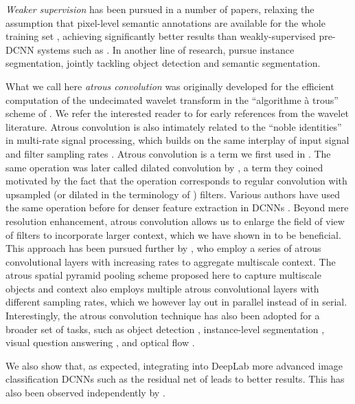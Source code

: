\documentclass[10pt,journal,compsoc]{IEEEtran}
\begin{document}
\emph{Weaker supervision} has been pursued in a number of papers, relaxing
the assumption that pixel-level semantic annotations are available for the whole
training set \cite{pinheiro2014weakly, papandreou2015weakly, pathakICCV15ccnn, hong2015decoupled},
achieving significantly better results than weakly-supervised pre-DCNN systems
such as \cite{vezhnevets2011weakly}. In another line of research,
\cite{hariharan2014simultaneous, liang2015proposal} pursue instance segmentation, jointly tackling  object detection and semantic
segmentation.

What we call here \emph{atrous convolution} was originally developed for the efficient
computation of the undecimated wavelet transform in the ``algorithme \`a trous''
scheme of \cite{holschneider1989real}. We refer the interested reader to
\cite{fowler2005redundant} for early references from the wavelet literature.
Atrous convolution is also intimately related to the ``noble identities'' in
multi-rate signal processing, which builds on the same interplay of input signal
and filter sampling rates \cite{vaidyanathan1990multirate}. Atrous convolution
is a term we first used in \cite{papandreou2014untangling}. The same operation
was later called dilated convolution by \cite{yu2015multi}, a term they coined
motivated by the fact that the operation corresponds to regular convolution
with upsampled (or dilated in the terminology of \cite{holschneider1989real})
filters. Various authors have used the same operation before for denser feature
extraction in DCNNs \cite{giusti2013fast, sermanet2013overfeat, papandreou2014untangling}.
Beyond mere resolution enhancement, atrous convolution allows us to enlarge the
field of view of filters to incorporate larger context, which we have shown in
\cite{chen2014semantic} to be beneficial. This approach has been pursued further
by \cite{yu2015multi}, who employ a series of atrous convolutional layers with
increasing rates to aggregate multiscale context. The atrous spatial pyramid
pooling scheme proposed here to capture multiscale objects and context also
employs multiple atrous convolutional layers with different sampling rates,
which we however lay out in parallel instead of in serial.
Interestingly, the atrous convolution technique has also been adopted for a broader set of  tasks, such as object detection
 \cite{liu2015ssd,dai2016rfcn}, instance-level segmentation \cite{dai2016instance}, visual question answering \cite{chen2015abc}, and optical flow
 \cite{sevilla2016optical}.

We also show that, as expected, integrating into DeepLab more advanced image
classification DCNNs such as the residual net of \cite{he2015deep} leads to
better results. This has also been observed independently by \cite{wu2016high}.
\end{document}
